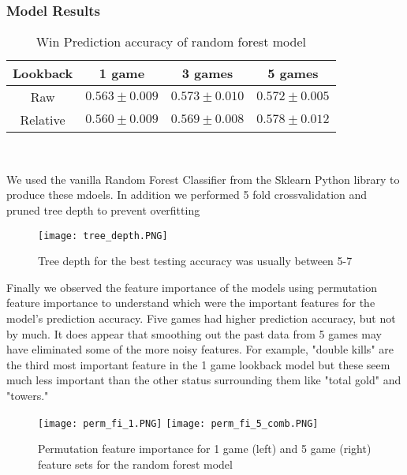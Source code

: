 \documentclass{article}
\begin{document}
\subsubsection{Model Results}

\begin{table}[h!]
    \begin{centering}
    \begin{tabular}{|c|c|c|c|} \hline
        Lookback & 1 game & 3 games & 5 games \\ \hline
        Raw & $0.563 \pm 0.009$ & $0.573 \pm 0.010$  &  $0.572 \pm 0.005$\\ \hline
        Relative & $0.560 \pm 0.009$ & $0.569 \pm 0.008$ & $0.578 \pm 0.012$ \\ \hline
    \end{tabular} \\[10pt]
    \caption{Win Prediction accuracy of random forest model}
    \end{centering}
\end{table}

We used the vanilla Random Forest Classifier from the Sklearn Python library to produce these mdoels. 
In addition we performed 5 fold crossvalidation and pruned tree depth to prevent overfitting

\begin{figure}[h!]
\centering
\texttt{[image: tree\_depth.PNG]}
\caption{Tree depth for the best testing accuracy was usually between 5-7}
\end{figure}

 Finally we observed the feature importance of the models using permutation feature importance to understand which were the important features for the model's prediction accuracy.
 Five games had higher prediction accuracy, but not by much. 
 It does appear that smoothing out the past data from 5 games may have eliminated some of the more noisy features. 
 For example, "double kills" are the third most important feature in the 1 game lookback model but these seem much less important than the other status surrounding them like "total gold" and "towers."
 
 
\begin{figure}[h!]
\centering
\texttt{[image: perm\_fi\_1.PNG]} \quad
\texttt{[image: perm\_fi\_5\_comb.PNG]}
\caption{Permutation feature importance for 1 game (left) and 5 game (right) feature sets for the random forest model}
\end{figure}
\end{document}
